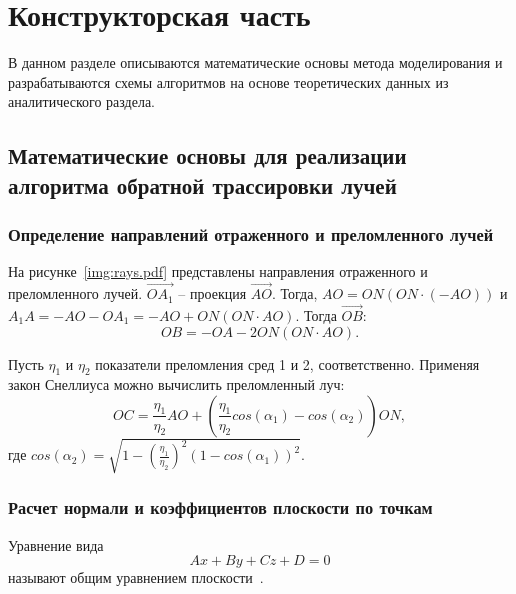 \section{Конструкторская часть}
В данном разделе описываются математические основы метода моделирования и разрабатываются схемы алгоритмов на основе теоретических данных из аналитического раздела.

\subsection{Математические основы для реализации алгоритма обратной трассировки лучей}

\subsubsection{Определение направлений отраженного и преломленного лучей}
На рисунке~\ref{img:rays.pdf} представлены направления отраженного и преломленного лучей.
$\overrightarrow{OA_1}$ -- проекция $\overrightarrow{AO}$. Тогда, $AO = ON(ON\cdot(-AO))$ и $A_1A = -AO-OA_1 = -AO+ON(ON\cdot AO)$.
Тогда $\overrightarrow{OB}$:
\begin{equation}
	OB = -OA -2 ON(ON\cdot AO).
\end{equation}

Пусть $\eta_{1}$ и $\eta_{2}$ показатели преломления сред 1 и 2, соответственно. Применяя закон Снеллиуса можно вычислить преломленный луч:
\begin{equation}
	OC = \frac{\eta_{1}}{\eta_{2}}AO + (\frac{\eta_{1}}{\eta_{2}} cos(\alpha_1) - cos(\alpha_2)) ON,
\end{equation}
где $cos(\alpha_2) = \sqrt{1 -   (\frac{\eta_{1}}{\eta_{2}}) ^ 2 (1 - cos(\alpha_1))^2  }$.


\subsubsection{Расчет нормали и коэффициентов плоскости по точкам}
Уравнение вида 
\begin{equation}
	Ax + By + Cz + D = 0
\end{equation}
называют общим уравнением плоскости~\cite{angeom}.

